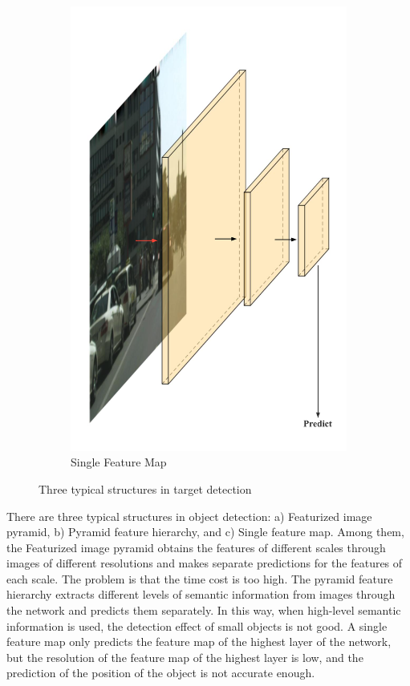 \begin{figure}[htbp]
\begin{subfigure}[t]{0.3\linewidth}
        \includegraphics[width=1\textwidth]{figures/fcnarch3.png}
        \caption{Single Feature Map}\label{FCNarch3}
    \end{subfigure}
    \caption{Three typical  structures in target detection}\label{FCNarch}
\end{figure}


There are three typical structures in object detection: a) Featurized image pyramid, b) Pyramid feature hierarchy, and c) Single feature map. Among them, the Featurized image pyramid obtains the features of different scales through images of different resolutions and makes separate predictions for the features of each scale. The problem is that the time cost is too high. The pyramid feature hierarchy extracts different levels of semantic information from images through the network and predicts them separately. In this way, when high-level semantic information is used, the detection effect of small objects is not good. A single feature map only predicts the feature map of the highest layer of the network, but the resolution of the feature map of the highest layer is low, and the prediction of the position of the object is not accurate enough.

